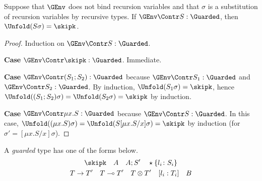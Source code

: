 \begin{lemma}\label{lemma:app:guarded=skip}
  Suppose that $\GEnv$ does not bind recursion variables and that
  $\sigma$ is a substitution of recursion variables by recursive types.
  If $\GEnv \Contr S : \Guarded$, then $\Unfold (S\sigma) = \skipk$.
\end{lemma}
\begin{proof}
  Induction on $\GEnv \Contr S : \Guarded$.

  \textbf{Case }$\GEnv \Contr \skipk : \Guarded$. Immediate.

  \textbf{Case }$\GEnv \Contr (S_1;S_2) : \Guarded$ because $\GEnv
  \Contr S_1 : \Guarded$ and $\GEnv \Contr S_2 : \Guarded$. By
  induction, $\Unfold (S_1\sigma) = \skipk$, hence $\Unfold ((S_1;S_2)\sigma) =
  \Unfold (S_2\sigma) = \skipk$ by induction.

  \textbf{Case }$\GEnv \Contr \mu x.S : \Guarded$ because $\GEnv
  \Contr S : \Guarded$. In this case, $\Unfold ((\mu x.S)\sigma) = \Unfold
  (S[\mu x.S/x]\sigma) = \skipk$ by induction (for $\sigma' = [\mu x.S/x]\sigma$).
\end{proof}

\begin{definition}
  A \emph{guarded} type has one of the forms below.
\begin{gather*}
  \skipk \quad A \quad A;S' \quad
  \star\{l_i\colon S_i\} %
  \\
  T \to T' \quad T \multimap T' \quad T \otimes T' \quad [l_i : T_i]
  \quad B 
\end{gather*}
\end{definition}


